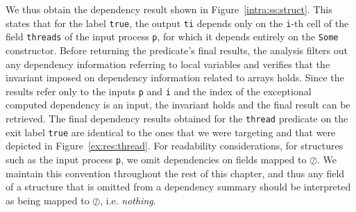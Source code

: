 \documentclass[11pt]{article}
\newcommand{\disp}[1]{\lstinline&#1&}
\begin{document}
We thus obtain the dependency result shown in Figure~\ref{intra:ss:struct}. 
This states that for the label \disp{true}, the output \disp{ti} depends only on 
the \disp{i}-th cell of the field \disp{threads} of the input process \disp{p}, 
for which it depends entirely on the \disp{Some} constructor. Before returning
the predicate's final results, the analysis filters out any dependency 
information referring to local variables and verifies that the invariant imposed 
on dependency information related to arrays holds. Since the results refer only
to the inputs \disp{p} and \disp{i} and the index of the exceptional computed
dependency is an input, the invariant holds and the final result can be retrieved.
The final dependency results obtained for the \disp{thread} predicate on the exit
label \disp{true} are identical to the ones that we were targeting and that were
depicted in Figure~\ref{ex:res:thread}. For readability considerations, for 
structures such as the input process \disp{p}, we omit dependencies on fields
mapped to $\oslash$. We maintain this convention throughout the rest of this 
chapter, and thus any field of a structure that is omitted from a dependency
summary should be interpreted as being mapped to $\oslash$, i.e. \emph{nothing}.  

\end{document}
